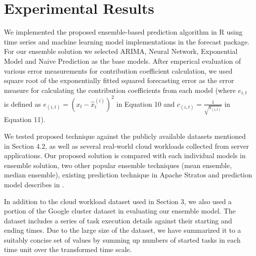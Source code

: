 
\section{Experimental Results}

We implemented the proposed ensemble-based prediction algorithm in R using time series and machine learning model implementations in the forecast package. For our ensemble solution we selected ARIMA, Neural Network, Exponential Model and Naive Prediction as the base models. After emperical  evaluation of various error measurements for contribution coefficient calculation, we used square root of the exponentially fitted squared  forecasting error as the error measure for calculating the contribution coefficients from each model (where $e_{i,t}$ is defined as $e_{(i,t)}=(x_t-\hat{x}^{(i)}_{t})^2$ in Equation 10 and $c_{(i,t)}=\frac{1}{\sqrt{b_{(i,t)}}}$ in Equation 11).

We tested proposed technique against the publicly available datasets mentioned in Section 4.2, as well as several real-world cloud workloads \cite{AutoscaleAnalyser} collected from server applications. Our proposed solution is compared with each individual models in ensemble solution, two other popular ensemble techniques (mean ensemble, median ensemble), existing prediction technique in Apache Stratos and prediction model describes in \cite{Roy_2011}. 


In addition to the cloud workload dataset used in Section 3, we also used a portion of the Google cluster dataset \cite{GoogleClusterData} in evaluating our ensemble model. The dataset includes a series of task execution details against their starting and ending times. Due to the large size of the dataset, we have summarized it to a suitably concise set of values by summing up numbers of started tasks in each time unit over the transformed time scale.

